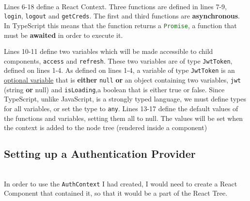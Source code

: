 \documentclass[../../main.tex]{subfiles}
\begin{document}
\noindent \\ Lines 6-18 define a React Context. Three functions are
defined in lines 7-9, \lstinline{login}, \lstinline{logout} and
\lstinline{getCreds}.
The first and third functions are \textbf{asynchronous}.
In TypeScript this means that the function returns a
\lstinline[language=typescript]{Promise}, a function that must be
\textbf{awaited} in order to execute it.

\noindent Lines 10-11 define two variables which will be made accessible to
child components, \lstinline{access} and \lstinline{refresh}.
These two variables are of type \lstinline{JwtToken}, defined on
lines 1-4. As defined on lines 1-4, a variable of type
\lstinline{JwtToken} is an \underline{optional variable} that is
\textbf{either} \lstinline{null} \textbf{or} an object containing
two variables, \lstinline{jwt} (string \textbf{or} null) and
\lstinline{isLoading},a boolean that is either true or false.
Since TypeScript, unlike JavaScript, is a strongly
typed language, we must define types for all variables, or set
the type to \lstinline{any}.
Lines 13-17 define the default values of the functions and variables,
setting them all to null. The values will be set when the context
is added to the node tree (rendered inside a component)

\subsection{Setting up a Authentication Provider}

\noindent \\ In order to use the \lstinline{AuthContext} I had
created, I would need to create a React Component that contained it,
so that it would be a part of the React Tree.




\begin{comment}
\subsubsection{Configuring Apollo Client to talk to the backend component}


\begin{lstlisting}[language=typescript]
  // Define a hook to be called within SessionProvider to access the session
  export function useSession() {
    const value = React.useContext(AuthContext)

    if (process.env.NODE_ENV !== 'production') {
      if (!value) {
        throw new Error('useSession must be wrapped in a <SessionProvider />');
      }
    }
    return value;
  }
\end{lstlisting}
\end{comment}
\end{document}
